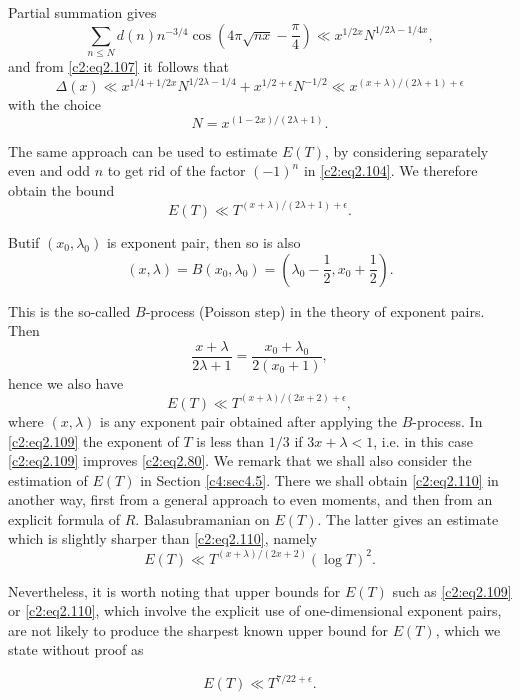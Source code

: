 Partial summation gives
$$
\sum_{n \leq N} d(n) n^{-3/4} \cos \left(4 \pi \sqrt{nx} -
\frac{\pi}{4} \right) \ll x^{1/2 x} N^{1/2 \lambda - 1/4 x}, 
$$
and from \eqref{c2:eq2.107} it follows that
\begin{equation}
  \Delta  (x) \ll x^{1/4 + 1/2 x}N^{1/2 \lambda - 1/4} + x^{1/2 +
    \epsilon}N^{-1/2} \ll x^{(x+ \lambda)/(2 \lambda
    +1)+\epsilon}\label{c2:eq2.108}
\end{equation}
with the choice
$$
N= x^{(1- 2x)/(2 \lambda +1)}.
$$

The same approach can be used to estimate $E(T)$, by considering
separately even and odd $n$ to get rid of the factor $(-1)^n$ in
\eqref{c2:eq2.104}. We therefore obtain the bound
\begin{equation}
  E(T) \ll T^{(x+ \lambda)/(2\lambda +1)+\epsilon}.\label{c2:eq2.109}
\end{equation}

But\pageoriginale if $(x_0, \lambda_0)$ is exponent pair, then so is
also
$$
(x, \lambda) = B(x_0, \lambda_0)= \left(\lambda_0 - \frac{1}{2}, x_0 +
\frac{1}{2}\right). 
$$

This is the so-called $B$-process (Poisson step) in the theory of
exponent pairs. Then
$$
\frac{x+ \lambda}{2 \lambda +1} = \frac{x_0 + \lambda_0}{2(x_0 + 1)},
$$
hence we also have
\begin{equation}
  E(T) \ll T^{(x+ \lambda)/(2x+2)+\epsilon},\label{c2:eq2.110}
\end{equation}
where $(x, \lambda)$ is any exponent pair obtained after applying the
$B$-process. In \eqref{c2:eq2.109} the exponent of $T$ is less than
$1/3$ if $3 x + \lambda< 1$, i.e. in this case \eqref{c2:eq2.109}
improves \eqref{c2:eq2.80}. We remark that we shall also consider the
estimation of $E(T)$ in Section \ref{c4:sec4.5}. There we shall
obtain \eqref{c2:eq2.110} in another way, first from a general
approach to even moments, and then from an explicit formula of
$R$. Balasubramanian on $E(T)$. The latter gives an estimate which is
slightly sharper than \eqref{c2:eq2.110}, namely
$$
E(T) \ll T^{(x + \lambda)/(2x+2)}(\log T)^2.
$$

Nevertheless, it is worth noting that upper bounds for $E(T)$ such as
\eqref{c2:eq2.109} or \eqref{c2:eq2.110}, which involve the explicit
use of one-dimensional exponent pairs, are not likely to produce the
sharpest known upper bound for $E(T)$, which we state without proof as

\begin{thm}\label{c2:thm2.9}
  \begin{equation}
    E(T) \ll T^{7/22+\epsilon}.\label{c2:eq2.111}
  \end{equation}
\end{thm}

